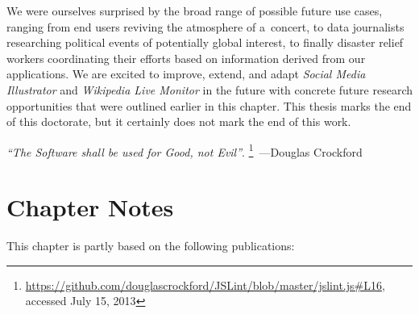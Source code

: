 We were ourselves surprised by the broad range
of possible future use cases, ranging from end users
reviving the atmosphere of a~concert,
to data journalists researching political events
of potentially global interest,
to finally disaster relief workers coordinating 
their efforts based on information derived from our applications.
We are excited to improve, extend, and adapt
\emph{Social Media Illustrator} and \emph{Wikipedia Live Monitor}
in the future with concrete future research opportunities
that were outlined earlier in this chapter.
This thesis marks the end of this doctorate,
but it certainly does not mark the end of this work.

\begin{flushright}
\textit{``The Software shall be used for Good, not Evil''}.%
\footnote{\url{https://github.com/douglascrockford/JSLint/blob/master/jslint.js\#L16},
accessed July 15, 2013}~---Douglas Crockford
\end{flushright}

\section*{Chapter Notes}
This chapter is partly based on the following publications:


\clearpage

